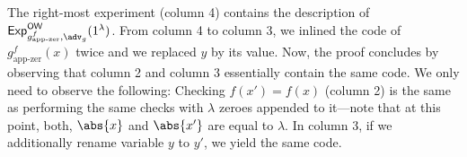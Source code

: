 \begin{center}
	\begin{pchstack}
		\pchspace
		\pchspace
		\pchspace
	\end{pchstack}
\end{center}
The right-most experiment (column 4) contains the description of ${\mathsf{Exp}}_{g^f_{\text{app-zer}},\adv_g}^{\mathsf{OW}}(1^\lambda)$.
From column 4 to column 3, we inlined the code of $g^f_{\text{app-zer}}(x)$ twice and we replaced $y$ by its value. Now, the proof concludes by observing that column 2 and column 3 essentially contain the same code. We only need to observe the following: Checking $f(x')=f(x)$ (column 2) is the same as performing the same checks with $\lambda$ zeroes appended to it---note that at this point, both, $\abs{x}$ and  $\abs{x'}$ are equal to $\lambda$. In column 3, if we additionally rename variable $y$ to $y'$, we yield the same code.

